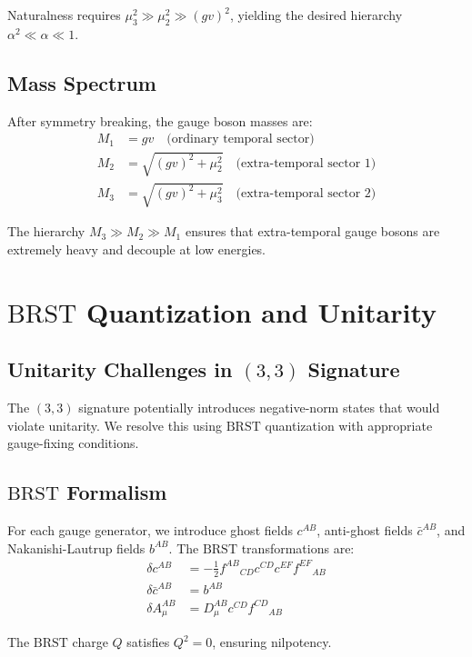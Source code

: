 \documentclass[12pt,a4paper]{article}
\newcommand{\BRST}{\text{BRST}}
\begin{document}
Naturalness requires $\mu_3^2 \gg \mu_2^2 \gg (gv)^2$, yielding the desired hierarchy $\alpha^2 \ll \alpha \ll 1$.

\subsection{Mass Spectrum}

After symmetry breaking, the gauge boson masses are:
\begin{align}
M_1 &= gv \quad \text{(ordinary temporal sector)}\\
M_2 &= \sqrt{(gv)^2 + \mu_2^2} \quad \text{(extra-temporal sector 1)}\\
M_3 &= \sqrt{(gv)^2 + \mu_3^2} \quad \text{(extra-temporal sector 2)}
\end{align}

The hierarchy $M_3 \gg M_2 \gg M_1$ ensures that extra-temporal gauge bosons are extremely heavy and decouple at low energies.

\section{$\BRST$ Quantization and Unitarity}
\label{sec:brst_quantization}

\subsection{Unitarity Challenges in $(3,3)$ Signature}

The $(3,3)$ signature potentially introduces negative-norm states that would violate unitarity. We resolve this using $\BRST$ quantization with appropriate gauge-fixing conditions.

\subsection{$\BRST$ Formalism}

For each gauge generator, we introduce ghost fields $c^{AB}$, anti-ghost fields $\bar{c}^{AB}$, and Nakanishi-Lautrup fields $b^{AB}$. The $\BRST$ transformations are:
\begin{align}
\delta c^{AB} &= -\frac{1}{2}f^{AB}{}_{CD} c^{CD} c^{EF} f^{EF}{}_{AB}\\
\delta \bar{c}^{AB} &= b^{AB}\\
\delta A_\mu^{AB} &= D_\mu^{AB} c^{CD} f^{CD}{}_{AB}
\end{align}

The $\BRST$ charge $Q$ satisfies $Q^2 = 0$, ensuring nilpotency.
\end{document}
